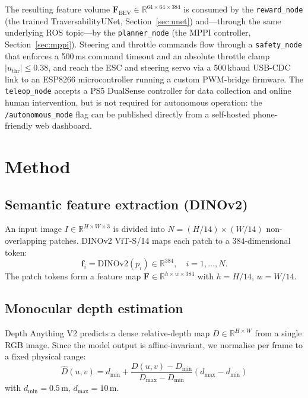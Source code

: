 \documentclass[conference]{IEEEtran}
\newcommand{\bev}{\mathbf{F}_{\mathrm{BEV}}}
\begin{document}
The resulting feature volume $\bev \in \mathbb{R}^{64\times64\times384}$ is
consumed by the \texttt{reward\_node} (the trained
TraversabilityUNet, Section~\ref{sec:unet}) and---through the same
underlying ROS topic---by the \texttt{planner\_node} (the MPPI controller,
Section~\ref{sec:mppi}). Steering and throttle commands flow through a
\texttt{safety\_node} that enforces a 500\,ms command timeout and an
absolute throttle clamp $|u_\text{thr}| \leq 0.38$, and reach the ESC and
steering servo via a 500\,kbaud USB-CDC link to an ESP8266 microcontroller
running a custom PWM-bridge firmware. The \texttt{teleop\_node} accepts a
PS5 DualSense controller for data collection and online human intervention,
but is not required for autonomous operation: the
\texttt{/autonomous\_mode} flag can be published directly from a
self-hosted phone-friendly web dashboard.

\section{Method}
\label{sec:method}

\subsection{Semantic feature extraction (DINOv2)}

An input image $I \in \mathbb{R}^{H \times W \times 3}$ is divided into
$N = (H/14) \times (W/14)$ non-overlapping patches. DINOv2 ViT-S/14
maps each patch to a $384$-dimensional token:
\begin{equation}
  \mathbf{f}_i = \text{DINOv2}(p_i) \in \mathbb{R}^{384}, \quad i = 1, \ldots, N.
\end{equation}
The patch tokens form a feature map $\mathbf{F} \in \mathbb{R}^{h \times w \times 384}$
with $h = H/14$, $w = W/14$.

\subsection{Monocular depth estimation}

Depth Anything V2 predicts a dense relative-depth map
$D \in \mathbb{R}^{H \times W}$ from a single RGB image. Since the model output is
affine-invariant, we normalise per frame to a fixed physical range:
\begin{equation}
  \hat{D}(u, v) = d_{\min} + \frac{D(u, v) - D_{\min}}{D_{\max} - D_{\min}}
  (d_{\max} - d_{\min})
\end{equation}
with $d_{\min} = 0.5$\,m, $d_{\max} = 10$\,m.
\end{document}
